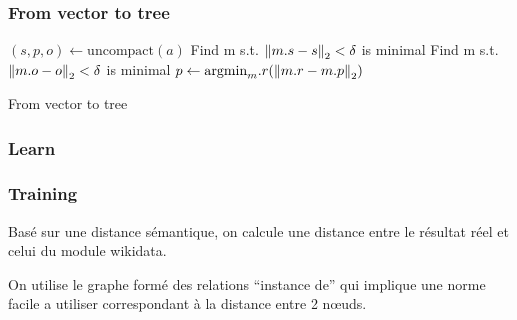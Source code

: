 \begin{frame}
\frametitle{From vector to tree}
\begin{algorithm}[H]
\DontPrintSemicolon  %
$(s,p,o) \gets \text{uncompact}(a)$\;
Find m s.t. $\left\|m.s-s\right\|_2<\delta$ is minimal \;
Find m s.t. $\left\|m.o-o\right\|_2<\delta$ is minimal \;
$p \gets \text{argmin}_m.r (\left\|m.r-m.p\right\|_2)$\;
\;
\caption{ From vector to tree }
\end{algorithm}

\end{frame}

\subsubsection{Learn}

\begin{frame}
\frametitle{Training}
Basé sur une distance sémantique, on calcule une distance entre le résultat réel et celui du module wikidata.

On utilise le graphe formé des relations ``instance de'' qui implique une norme facile a utiliser correspondant à la distance entre 2 nœuds.
\end{frame} 
